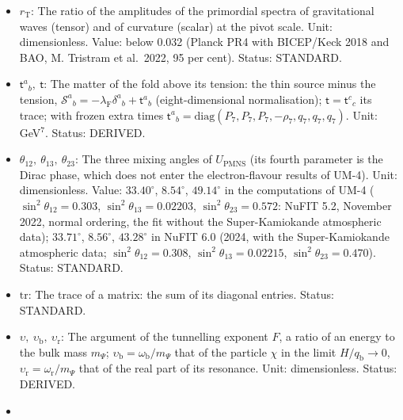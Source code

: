 \documentclass[
  10pt,
]{article}
\begin{document}
\begin{itemize}
  \(-(\rho - 3\mathcal{P})/2 - q_{\mathrm{SM}} - q_\chi - q_{\mathrm{P}}\):
  0 for radiation, \(-\rho/2\) for dust, \(-\rho\) for a vacuum energy;
  today \(-0.842\,\rho_{\mathrm{c}}^{(0)}\) if the baryons have no
  pressure along the extra times (ASSUMED). Status: DERIVED (the value),
  ASSUMED (that the fold fluid supplies it).
\item
  \(r_{\mathrm{T}}\): The ratio of the amplitudes of the primordial
  spectra of gravitational waves (tensor) and of curvature (scalar) at
  the pivot scale. Unit: dimensionless. Value: below 0.032 (Planck PR4
  with BICEP/Keck 2018 and BAO, M. Tristram et al.~2022, 95 per cent).
  Status: STANDARD.
\item
  \(\mathsf{t}^a{}_b,\ \mathsf{t}\): The matter of the fold above its
  tension: the thin source minus the tension,
  \(\mathcal{S}^a{}_b = -\lambda_{\mathrm{F}}\delta^a{}_b + \mathsf{t}^a{}_b\)
  (eight-dimensional normalisation); \(\mathsf{t} = \mathsf{t}^c{}_c\)
  its trace; with frozen extra times
  \(\mathsf{t}^a{}_b = \mathrm{diag}(P_7, P_7, P_7, -\rho_7, q_7, q_7, q_7)\).
  Unit: GeV\(^7\). Status: DERIVED.
\item
  \(\theta_{12},\ \theta_{13},\ \theta_{23}\): The three mixing angles
  of \(U_{\mathrm{PMNS}}\) (its fourth parameter is the Dirac phase,
  which does not enter the electron-flavour results of UM-4). Unit:
  dimensionless. Value: \(33.40^\circ\), \(8.54^\circ\), \(49.14^\circ\)
  in the computations of UM-4 (\(\sin^2\theta_{12} = 0.303\),
  \(\sin^2\theta_{13} = 0.02203\), \(\sin^2\theta_{23} = 0.572\): NuFIT
  5.2, November 2022, normal ordering, the fit without the
  Super-Kamiokande atmospheric data); \(33.71^\circ\), \(8.56^\circ\),
  \(43.28^\circ\) in NuFIT 6.0 (2024, with the Super-Kamiokande
  atmospheric data; \(\sin^2\theta_{12} = 0.308\),
  \(\sin^2\theta_{13} = 0.02215\), \(\sin^2\theta_{23} = 0.470\)).
  Status: STANDARD.
\item
  \(\mathrm{tr}\): The trace of a matrix: the sum of its diagonal
  entries. Status: STANDARD.
\item
  \(\upsilon,\ \upsilon_{\mathrm{b}},\ \upsilon_{\mathrm{r}}\): The
  argument of the tunnelling exponent \(F\), a ratio of an energy to the
  bulk mass \(m_\Psi\);
  \(\upsilon_{\mathrm{b}} = \omega_{\mathrm{b}}/m_\Psi\) that of the
  particle \(\chi\) in the limit \(H/q_{\mathrm{b}} \to 0\),
  \(\upsilon_{\mathrm{r}} = \omega_{\mathrm{r}}/m_\Psi\) that of the
  real part of its resonance. Unit: dimensionless. Status: DERIVED.
\item

\end{itemize}
\end{document}

